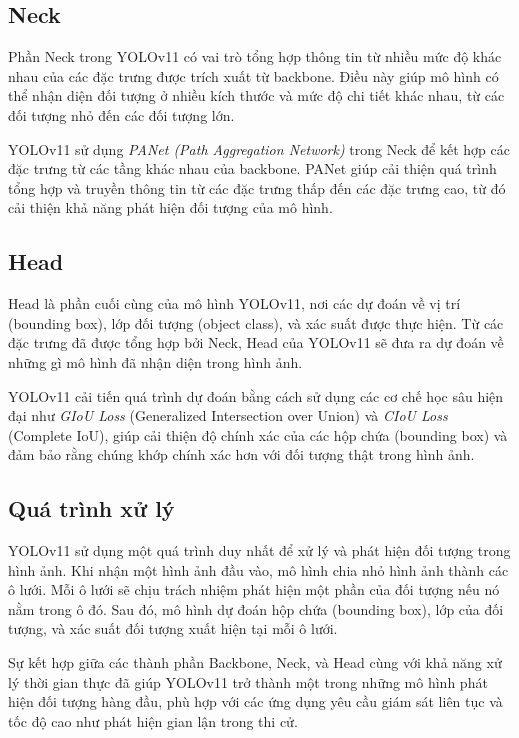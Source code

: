 \documentclass[conference]{IEEEtran}
\begin{document}
\subsection{Neck}
Phần Neck trong YOLOv11 có vai trò tổng hợp thông tin từ nhiều mức độ khác nhau của các đặc trưng được trích xuất từ backbone. Điều này giúp mô hình có thể nhận diện đối tượng ở nhiều kích thước và mức độ chi tiết khác nhau, từ các đối tượng nhỏ đến các đối tượng lớn.

YOLOv11 sử dụng \textit{PANet (Path Aggregation Network)} trong Neck để kết hợp các đặc trưng từ các tầng khác nhau của backbone. PANet giúp cải thiện quá trình tổng hợp và truyền thông tin từ các đặc trưng thấp đến các đặc trưng cao, từ đó cải thiện khả năng phát hiện đối tượng của mô hình.

\subsection{Head}
Head là phần cuối cùng của mô hình YOLOv11, nơi các dự đoán về vị trí (bounding box), lớp đối tượng (object class), và xác suất được thực hiện. Từ các đặc trưng đã được tổng hợp bởi Neck, Head của YOLOv11 sẽ đưa ra dự đoán về những gì mô hình đã nhận diện trong hình ảnh.

YOLOv11 cải tiến quá trình dự đoán bằng cách sử dụng các cơ chế học sâu hiện đại như \textit{GIoU Loss} (Generalized Intersection over Union) và \textit{CIoU Loss} (Complete IoU), giúp cải thiện độ chính xác của các hộp chứa (bounding box) và đảm bảo rằng chúng khớp chính xác hơn với đối tượng thật trong hình ảnh.

\subsection{Quá trình xử lý}
YOLOv11 sử dụng một quá trình duy nhất để xử lý và phát hiện đối tượng trong hình ảnh. Khi nhận một hình ảnh đầu vào, mô hình chia nhỏ hình ảnh thành các ô lưới. Mỗi ô lưới sẽ chịu trách nhiệm phát hiện một phần của đối tượng nếu nó nằm trong ô đó. Sau đó, mô hình dự đoán hộp chứa (bounding box), lớp của đối tượng, và xác suất đối tượng xuất hiện tại mỗi ô lưới.

Sự kết hợp giữa các thành phần Backbone, Neck, và Head cùng với khả năng xử lý thời gian thực đã giúp YOLOv11 trở thành một trong những mô hình phát hiện đối tượng hàng đầu, phù hợp với các ứng dụng yêu cầu giám sát liên tục và tốc độ cao như phát hiện gian lận trong thi cử.
\end{document}
